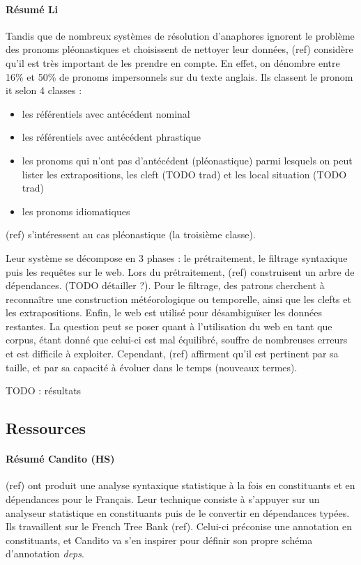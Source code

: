 \documentclass[a4paper,12pt]{article}
\begin{document}
\paragraph{Résumé Li}
Tandis que de nombreux systèmes de résolution d'anaphores ignorent le problème des pronoms pléonastiques et choisissent de nettoyer leur données, (ref) considère qu'il est très important de les prendre en compte.
En effet, on dénombre entre 16\% et 50\% de pronoms impersonnels sur du texte anglais.
Ils classent le pronom \og it \fg{} selon 4 classes :
\begin{itemize}
\item les référentiels avec antécédent nominal
\item les référentiels avec antécédent phrastique
\item les pronoms qui n'ont pas d'antécédent (pléonastique) parmi lesquels on peut lister les extrapositions, les cleft (TODO trad) et les local situation (TODO trad)
\item les pronoms idiomatiques
\end{itemize}
(ref) s'intéressent au cas pléonastique (la troisième classe).

Leur système se décompose en 3 phases : le prétraitement, le filtrage syntaxique puis les requêtes sur le web.
Lors du prétraitement, (ref) construisent un arbre de dépendances. (TODO détailler ?). Pour le filtrage, des patrons cherchent à reconnaître une construction météorologique ou temporelle, ainsi que les clefts et les extrapositions.
Enfin, le web est utilisé pour désambiguïser les données restantes. La question peut se poser quant à l'utilisation du web en tant que corpus, étant donné que celui-ci est mal équilibré, souffre de nombreuses erreurs et est difficile à exploiter. Cependant, (ref) affirment qu'il est pertinent par sa taille, et par sa capacité à évoluer dans le temps (nouveaux termes).

TODO : résultats




\subsection{Ressources}

\paragraph{Résumé Candito (HS)}
(ref) ont produit une analyse syntaxique statistique à la fois en constituants et en dépendances pour le Français. Leur technique consiste à s'appuyer sur un analyseur statistique en constituants puis de le convertir en dépendances typées. Ils travaillent sur le French Tree Bank (ref). Celui-ci préconise une annotation en constituants, et Candito va s'en inspirer pour définir son propre schéma d'annotation \textit{deps}. 
\end{document}
